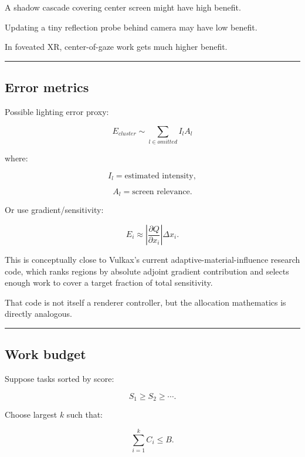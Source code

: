 A shadow cascade covering center screen might have high benefit.

Updating a tiny reflection probe behind camera may have low benefit.

In foveated XR, center-of-gaze work gets much higher benefit.

\begin{center}\rule{0.5\linewidth}{0.5pt}\end{center}

\subsection{Error metrics}\label{04-visual-computing-ii-ch040-error-metrics}

\hypertarget{04-visual-computing-ii-ch040-error-metrics}{}

Possible lighting error proxy:

\[
E_{cluster}
\sim
\sum_{l\in omitted}
I_l
A_l
\]

where:

\[
I_l=\text{estimated intensity},
\]

\[
A_l=\text{screen relevance}.
\]

Or use gradient/sensitivity:

\[
E_i
\approx
\left|
\frac{\partial Q}{\partial x_i}
\right|
\Delta x_i.
\]

This is conceptually close to Vulkax's current adaptive-material-influence research code, which ranks regions by absolute adjoint gradient contribution and selects enough work to cover a target fraction of total sensitivity.

That code is not itself a renderer controller, but the allocation mathematics is directly analogous.

\begin{center}\rule{0.5\linewidth}{0.5pt}\end{center}

\subsection{Work budget}\label{04-visual-computing-ii-ch040-work-budget}

\hypertarget{04-visual-computing-ii-ch040-work-budget}{}

Suppose tasks sorted by score:

\[
S_1\ge S_2\ge\cdots.
\]

Choose largest \(k\) such that:

\[
\boxed{
\sum_{i=1}^{k}C_i
\le B.
}
\]

